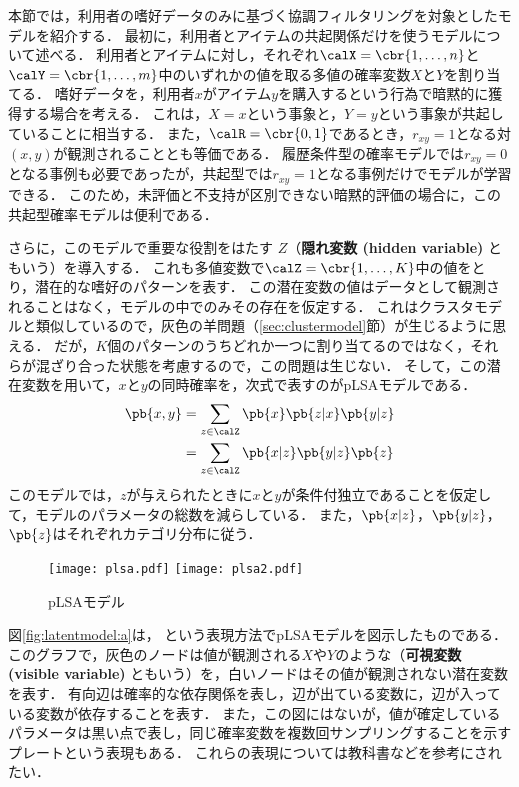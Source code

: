 本節では，利用者の嗜好データのみに基づく協調フィルタリングを対象としたモデル\cite{ijcai:99:01}を紹介する．
最初に，利用者とアイテムの共起関係だけを使うモデルについて述べる．
利用者とアイテムに対し，それぞれ$\calX=\cbr{1,\dotsc,n}$と$\calY=\cbr{1,\dotsc,m}$中のいずれかの値を取る多値の確率変数$X$と$Y$を割り当てる．
嗜好データを，利用者$x$がアイテム$y$を購入するという行為で暗黙的に獲得する場合を考える．
これは，$X=x$という事象と，$Y=y$という事象が共起していることに相当する．
また，$\calR=\cbr{0,1}$であるとき，$r_{xy}=1$となる対$(x,y)$が観測されることとも等価である．
履歴条件型の確率モデルでは$r_{xy}=0$となる事例も必要であったが，共起型では$r_{xy}=1$となる事例だけでモデルが学習できる．
このため，未評価と不支持が区別できない暗黙的評価の場合に，この共起型確率モデルは便利である．

さらに，このモデルで重要な役割をはたす $Z$（\textbf{隠れ変数 (hidden variable)} ともいう）を導入する．
これも多値変数で$\calZ=\cbr{1,\dotsc,K}$中の値をとり，潜在的な嗜好のパターンを表す．
この潜在変数の値はデータとして観測されることはなく，モデルの中でのみその存在を仮定する．
これはクラスタモデルと類似しているので，灰色の羊問題（\ref{sec:clustermodel}節）が生じるように思える．
だが，$K$個のパターンのうちどれか一つに割り当てるのではなく，それらが混ざり合った状態を考慮するので，この問題は生じない．
そして，この潜在変数を用いて，$x$と$y$の同時確率を，次式で表すのがpLSAモデルである．
\begin{align}
 \pb{x,y}& = \sum_{z\in \calZ}\pb{x}\pb{z|x}\pb{y|z}\label{eq:origplsamodel}\\
& = \sum_{z\in \calZ}\pb{x|z}\pb{y|z}\pb{z}
\label{eq:plsamodel}
\end{align}
このモデルでは，$z$が与えられたときに$x$と$y$が条件付独立であることを仮定して，モデルのパラメータの総数を減らしている．
また，$\pb{x|z}$，$\pb{y|z}$，$\pb{z}$はそれぞれカテゴリ分布に従う．

\begin{figure}
\centering
{}%
{\texttt{[image: plsa.pdf]}}%
\hspace{0.1\fullwidth}%
%
{\texttt{[image: plsa2.pdf]}}
\caption{pLSAモデル\cite{ijcai:99:01}}
\label{fig:latentmodel}
\end{figure}

図\ref{fig:latentmodel:a}は， という表現方法でpLSAモデルを図示したものである．
このグラフで，灰色のノードは値が観測される$X$や$Y$のような（\textbf{可視変数 (visible variable)} ともいう）を，白いノードはその値が観測されない潜在変数を表す．
有向辺は確率的な依存関係を表し，辺が出ている変数に，辺が入っている変数が依存することを表す．
また，この図にはないが，値が確定しているパラメータは黒い点で表し，同じ確率変数を複数回サンプリングすることを示すプレートという表現もある．
これらの表現については教科書\cite[8章]{jpublist:077x}などを参考にされたい．

